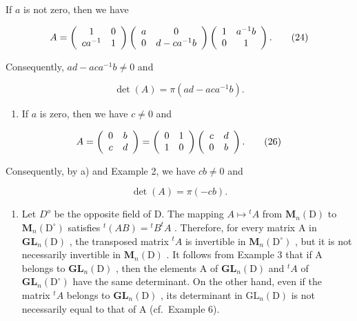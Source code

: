 If \(a\) is not zero, then we have

\[
A = \left( \begin{array}{c c} 1 & 0 \\ c a ^ {- 1} & 1 \end{array} \right) \left( \begin{array}{c c} a & 0 \\ 0 & d - c a ^ {- 1} b \end{array} \right) \left( \begin{array}{c c} 1 & a ^ {- 1} b \\ 0 & 1 \end{array} \right).\tag{24}
\]

Consequently, \(ad - aca^{-1}b \neq 0\) and

\[
\det (A) = \pi (a d - a c a ^ {- 1} b).\tag{25}
\]

\begin{enumerate}
\def\labelenumi{\alph{enumi})}
\setcounter{enumi}{1}
\tightlist
\item
  If \(a\) is zero, then we have \(c \neq 0\) and
\end{enumerate}

\[
A = \left( \begin{array}{c c} 0 & b \\ c & d \end{array} \right) = \left( \begin{array}{c c} 0 & 1 \\ 1 & 0 \end{array} \right) \left( \begin{array}{c c} c & d \\ 0 & b \end{array} \right).\tag{26}
\]

Consequently, by a) and Example 2, we have \(cb \neq 0\) and

\[
\det (A) = \pi (- c b).\tag{27}
\]

\begin{enumerate}
\def\labelenumi{\arabic{enumi})}
\setcounter{enumi}{6}
\tightlist
\item
  Let \(D^{o}\) be the opposite field of D. The mapping \(A \mapsto {}^{t}A\) from \(\mathbf{M}_{n}(\mathrm{D})\) to \(\mathbf{M}_{n}(\mathrm{D}^{\circ})\) satisfies \({}^{t}(AB) = {}^{t}B^{t}A\) . Therefore, for every matrix A in \(\mathbf{GL}_{n}(\mathrm{D})\) , the transposed matrix \({}^{t}A\) is invertible in \(\mathbf{M}_{n}(\mathrm{D}^{\circ})\) , but it is not necessarily invertible in \(\mathbf{M}_{n}(\mathrm{D})\) . It follows from Example 3 that if A belongs to \(\mathbf{GL}_{n}(\mathrm{D})\) , then the elements A of \(\mathbf{GL}_{n}(\mathrm{D})\) and \({}^{t}A\) of \(\mathbf{GL}_{n}(\mathrm{D}^{\circ})\) have the same determinant. On the other hand, even if the matrix \({}^{t}A\) belongs to \(\mathbf{GL}_{n}(\mathrm{D})\) , its determinant in \(\mathrm{GL}_{n}(\mathrm{D})\) is not necessarily equal to that of A (cf.~Example 6).
\end{enumerate}

